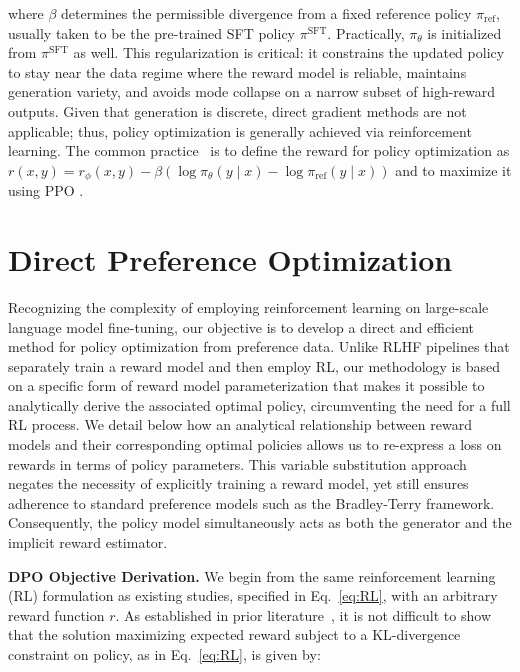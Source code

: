where $\beta$ determines the permissible divergence from a fixed reference policy $\pi_\text{ref}$, usually taken to be the pre-trained SFT policy $\pi^\text{SFT}$. Practically, $\pi_\theta$ is initialized from $\pi^\text{SFT}$ as well. This regularization is critical: it constrains the updated policy to stay near the data regime where the reward model is reliable, maintains generation variety, and avoids mode collapse on a narrow subset of high-reward outputs. Given that generation is discrete, direct gradient methods are not applicable; thus, policy optimization is generally achieved via reinforcement learning. The common practice~\citep{ziegler2020finetuning, stiennon2022learning, bai2022training, ouyang2022training} is to define the reward for policy optimization as $r(x, y) = r_{\phi}(x, y) -\beta (\log \pi_{\theta}(y\mid x) - \log \pi_\text{ref}(y\mid x))$ and to maximize it using PPO \cite{schulman2017proximal}.

\section{Direct Preference Optimization}\label{sec:DPO}

Recognizing the complexity of employing reinforcement learning on large-scale language model fine-tuning, our objective is to develop a direct and efficient method for policy optimization from preference data. Unlike RLHF pipelines that separately train a reward model and then employ RL, our methodology is based on a specific form of reward model parameterization that makes it possible to analytically derive the associated optimal policy, circumventing the need for a full RL process. We detail below how an analytical relationship between reward models and their corresponding optimal policies allows us to re-express a loss on rewards in terms of policy parameters. This variable substitution approach negates the necessity of explicitly training a reward model, yet still ensures adherence to standard preference models such as the Bradley-Terry framework. Consequently, the policy model simultaneously acts as both the generator and the implicit reward estimator.

\textbf{DPO Objective Derivation.} We begin from the same reinforcement learning (RL) formulation as existing studies, specified in Eq.~\ref{eq:RL}, with an arbitrary reward function $r$. As established in prior literature~\citep{peters2007reinforcement, peng2019advantage, korbak2022reinforcement, go2023aligning}, it is not difficult to show that the solution maximizing expected reward subject to a KL-divergence constraint on policy, as in Eq.~\ref{eq:RL}, is given by:


